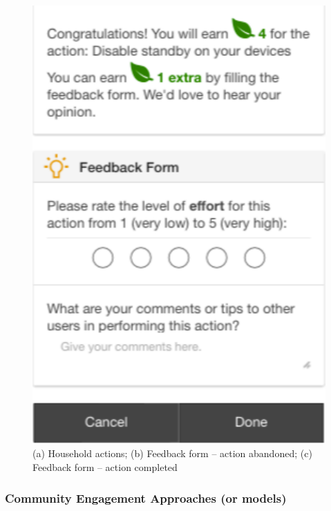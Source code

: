\begin{figure}
\begin{center}
\begin{minipage}[t!]{0.33\linewidth}
        \end{minipage}
        \begin{minipage}[t!]{0.31\linewidth}
        	       \includegraphics[width=1\linewidth]{img/action_completed.pdf}
                \end{minipage}
      \end{center}
      \caption{(a) Household actions; (b) Feedback form -- action abandoned; (c) Feedback form -- action completed}\label{fig:form}
\end{figure}



\subsubsection{Community Engagement Approaches (or models)} %


